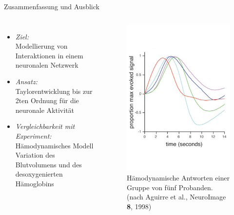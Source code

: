 \documentclass{beamer}
\begin{document}
\begin{frame}[t]{Zusammenfassung und Ausblick}
	\begin{columns}
		\column[t]{6.8cm}
		\vspace{-0.5 cm}
		\begin{itemize}
			\item \textit{Ziel:} \\Modellierung von Interaktionen in einem neuronalen Netzwerk\\[0.5cm]
			\item \textit{Ansatz:} \\Taylorentwicklung bis zur 2ten Ordnung für die neuronale Aktivität \\[0.5cm]
			\item \textit{Vergleichbarkeit mit Experiment:} \\ Hämodynamisches Modell Variation des Blutvolumens und des desoxygenierten Hämoglobins
		\end{itemize}
		\column[t]{6cm}
		\begin{figure}
			\centering
			\vspace{-1cm}
			\includegraphics[width=0.98\linewidth]{res/Aguirre1998-BOLD-hemodynamic-responses.pdf}
			\vspace{-0.1cm}
			\caption*{\scriptsize Hämodynamische Antworten einer Gruppe von fünf Probanden. \\ (nach Aguirre et al., NeuroImage \textbf{8}, 1998)}
		\end{figure}
	\end{columns}
\end{frame}
\end{document}

